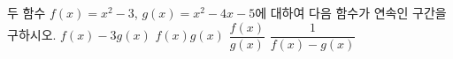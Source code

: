 두 함수 $f(x)=x^2-3$, $g(x)=x^2-4x-5$에 대하여 다음 함수가 연속인 구간을 구하시오.
 $f(x)-3g(x)$
 $f(x)g(x)$
 $\dfrac{f(x)}{g(x)}$
 $\dfrac{1}{f(x)-g(x)}$
